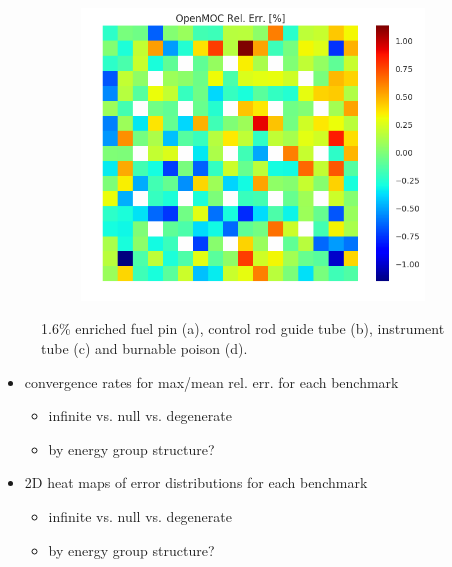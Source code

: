 \begin{figure}[h!]
\begin{subfigure}{.33\textwidth}
  \caption{}
  \label{fig:chap8-assm-1.6-degenerate-fiss-8}
\end{subfigure}%
\begin{subfigure}{.33\textwidth}
  \centering
  \includegraphics[width=\linewidth]{figures/quantification/assm-16/degenerate-fiss-err-70}
  \caption{}
  \label{fig:chap8-assm-1.6-degenerate-fiss-70}
\end{subfigure}
\caption[Fission rate errors for a 1.6\& enriched assembly]{1.6\% enriched fuel pin (a), control rod guide tube (b), instrument tube (c) and burnable poison (d).}
\label{fig:chap8-assm-1.6-fiss-err}
\end{figure}

\begin{itemize}[noitemsep]
  \item convergence rates for max/mean rel. err. for each benchmark
  \begin{itemize}[noitemsep]
    \item infinite vs. null vs. degenerate
    \item by energy group structure?
  \end{itemize}
  \item 2D heat maps of error distributions for each benchmark
  \begin{itemize}[noitemsep]
    \item infinite vs. null vs. degenerate
    \item by energy group structure?
  \end{itemize}
\end{itemize}

